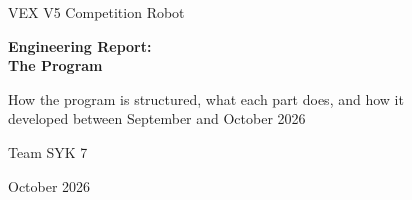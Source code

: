 \documentclass[12pt,a4paper]{report}
\begin{document}
\begin{titlepage}
  \centering
  \vspace*{2cm}
  {\large VEX V5 Competition Robot\par}
  \vspace{1.5cm}
  {\LARGE\bfseries Engineering Report:\\[0.3em] The Program\par}
  \vspace{1.5cm}
  {\large How the program is structured, what each part does, and how it\\
  developed between September and October 2026\par}
  \vfill
  {\large Team SYK 7\par}
  \vspace{0.5em}
  {October 2026\par}
\end{titlepage}

\tableofcontents
\clearpage
{}










\end{document}
